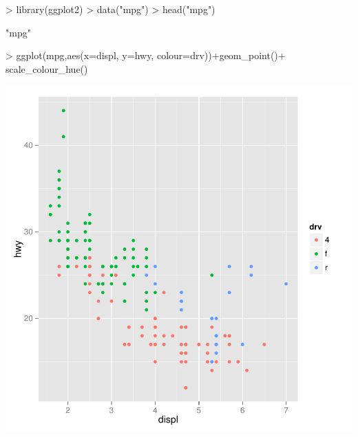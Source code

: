 \documentclass{article}
\begin{document}
\begin{Schunk}
\begin{Sinput}
> library(ggplot2)
> data("mpg")
> head("mpg")
\end{Sinput}
\begin{Soutput}
[1] "mpg"
\end{Soutput}
\begin{Sinput}
> ggplot(mpg,aes(x=displ, y=hwy, colour=drv))+geom_point()+ scale_colour_hue()
\end{Sinput}
\end{Schunk}
\includegraphics{tutorialJY-Cars2}
\end{document}
